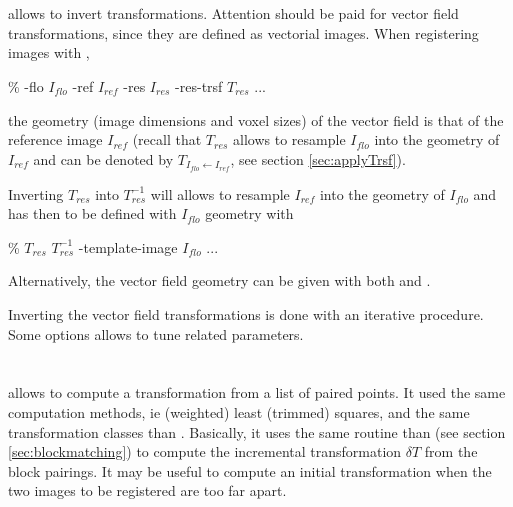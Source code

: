 \section{\invTrsf}
\label{sec:invTrsf}

\invTrsf allows to invert transformations.  Attention should be paid for vector field transformations, since they are defined as vectorial images. When registering images with \blockmatching,
\begin{code}{0.8}
\% \blockmatching -flo $I_{flo}$ -ref $I_{ref}$ -res $I_{res}$ -res-trsf $T_{res}$ ...
\end{code}
 the geometry (image dimensions and voxel sizes) of the vector field is that of the reference image $I_{ref}$ (recall that $T_{res}$ allows to resample $I_{flo}$ into the geometry of $I_{ref}$ and can be denoted by $T_{I_{flo} \leftarrow I_{ref}}$, see section \ref{sec:applyTrsf}).

Inverting $T_{res}$ into $T^{-1}_{res}$  will allows to resample $I_{ref}$ into the geometry of $I_{flo}$ and has then to be defined with  $I_{flo}$ geometry with  
\begin{code}{0.8}
\% \invTrsf  $T_{res}$  $T^{-1}_{res}$ -template-image $I_{flo}$ ...
\end{code}
Alternatively, the vector field geometry can be given with both  and .

Inverting the vector field transformations is done with an iterative procedure. Some options allows to tune related parameters.



\section{\pointmatching}
\label{sec:pointmatching}

\pointmatching allows to compute a transformation from a list of paired points. It used the same computation methods, ie (weighted) least (trimmed) squares, and the same transformation classes than \blockmatching. Basically, it uses the same routine than \blockmatching (see section \ref{sec:blockmatching}) to compute the incremental transformation $\delta T$ from the block pairings.
It may be useful to compute an initial transformation when the two images to be registered are too far apart.



